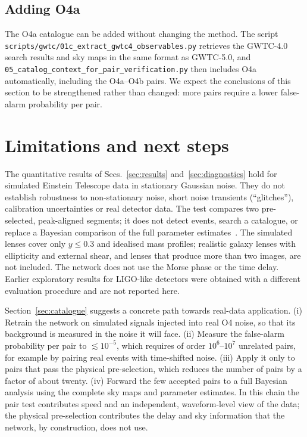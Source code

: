 \documentclass[aps,prd,twocolumn,superscriptaddress,nofootinbib,floatfix]{revtex4-2}
\begin{document}
\subsection{Adding O4a}
\label{sec:o4a}

The O4a catalogue can be added without changing the method.
The script \nolinkurl{scripts/gwtc/01c_extract_gwtc4_observables.py} retrieves the GWTC-4.0 search results and sky maps in the same format as GWTC-5.0, and \nolinkurl{05_catalog_context_for_pair_verification.py} then includes O4a automatically, including the O4a--O4b pairs.
We expect the conclusions of this section to be strengthened rather than changed: more pairs require a lower false-alarm probability per pair.

\section{Limitations and next steps}
\label{sec:limits}

The quantitative results of Secs.~\ref{sec:results} and~\ref{sec:diagnostics} hold for simulated Einstein Telescope data in stationary Gaussian noise.
They do not establish robustness to non-stationary noise, short noise transients (``glitches''), calibration uncertainties or real detector data.
The test compares two pre-selected, peak-aligned segments; it does not detect events, search a catalogue, or replace a Bayesian comparison of the full parameter estimates~\cite{Haris2018,LoHernandez2023,Janquart2021GOLUM}.
The simulated lenses cover only $y\le0.3$ and idealised mass profiles; realistic galaxy lenses with ellipticity and external shear, and lenses that produce more than two images, are not included.
The network does not use the Morse phase or the time delay.
Earlier exploratory results for LIGO-like detectors were obtained with a different evaluation procedure and are not reported here.

Section~\ref{sec:catalogue} suggests a concrete path towards real-data application.
(i) Retrain the network on simulated signals injected into real O4 noise, so that its background is measured in the noise it will face.
(ii) Measure the false-alarm probability per pair to $\lesssim10^{-5}$, which requires of order $10^{6}$--$10^{7}$ unrelated pairs, for example by pairing real events with time-shifted noise.
(iii) Apply it only to pairs that pass the physical pre-selection, which reduces the number of pairs by a factor of about twenty.
(iv) Forward the few accepted pairs to a full Bayesian analysis using the complete sky maps and parameter estimates.
In this chain the pair test contributes speed and an independent, waveform-level view of the data; the physical pre-selection contributes the delay and sky information that the network, by construction, does not use.
\end{document}
